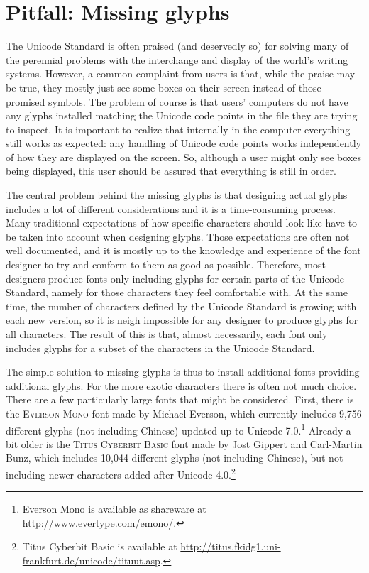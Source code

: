 \section{Pitfall: Missing glyphs}
\label{pitfall-missing-glyphs}

The Unicode Standard is often praised (and deservedly so) for solving many of
the perennial problems with the interchange and display of the world's writing
systems. However, a common complaint from users is that, while the praise may be
true, they mostly just see some boxes on their screen instead of those promised
symbols. The problem of course is that users' computers do not have any glyphs
installed matching the Unicode code points in the file they are trying to
inspect. It is important to realize that internally in the computer everything
still works as expected: any handling of Unicode code points works independently
of how they are displayed on the screen. So, although a user might only see
boxes being displayed, this user should be assured that everything is still in
order.

The central problem behind the missing glyphs is that designing actual glyphs
includes a lot of different considerations and it is a time-consuming process.
Many traditional expectations of how specific characters should look like have
to be taken into account when designing glyphs. Those expectations are often not
well documented, and it is mostly up to the knowledge and experience of the font
designer to try and conform to them as good as possible. Therefore, most
designers produce fonts only including glyphs for certain parts of the Unicode
Standard, namely for those characters they feel comfortable with. At the same
time, the number of characters defined by the Unicode Standard is growing with
each new version, so it is neigh impossible for any designer to produce glyphs
for all characters. The result of this is that, almost necessarily, each font
only includes glyphs for a subset of the characters in the Unicode Standard.

The simple solution to missing glyphs is thus to install additional fonts
providing additional glyphs. For the more exotic characters there is often not
much choice. There are a few particularly large fonts that might be considered.
First, there is the \textsc{Everson Mono} font made by Michael Everson, which
currently includes 9,756 different glyphs (not including Chinese) updated up to
Unicode 7.0.\footnote{Everson Mono is available as shareware at
\url{http://www.evertype.com/emono/}.} Already a bit older is the \textsc{Titus
Cyberbit Basic} font made by Jost Gippert and Carl-Martin Bunz, which includes
10,044 different glyphs (not including Chinese), but not including newer
characters added after Unicode 4.0.\footnote{Titus Cyberbit Basic is available
at \url{http://titus.fkidg1.uni-frankfurt.de/unicode/tituut.asp}.}

